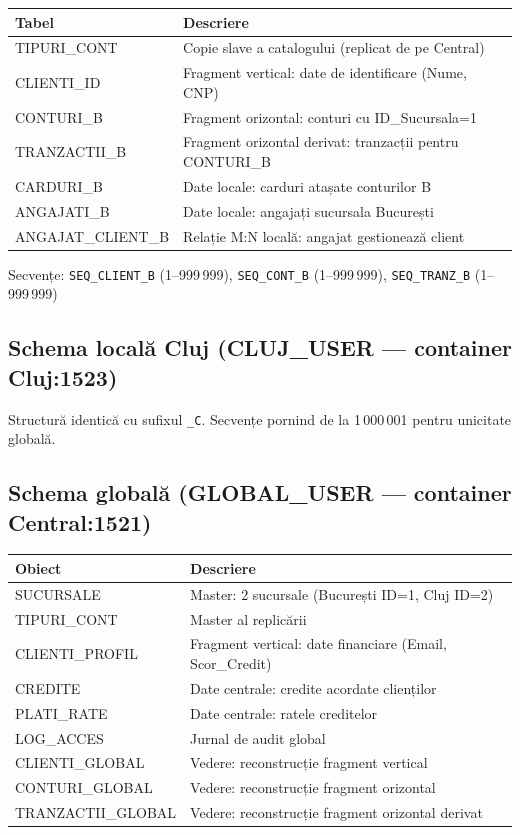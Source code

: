 \documentclass[12pt,a4paper]{article}
\begin{document}
\begin{center}
\begin{tabular}{ll}
\toprule
\textbf{Tabel} & \textbf{Descriere} \\
\midrule
TIPURI\_CONT & Copie slave a catalogului (replicat de pe Central) \\
CLIENTI\_ID & Fragment vertical: date de identificare (Nume, CNP) \\
CONTURI\_B & Fragment orizontal: conturi cu ID\_Sucursala=1 \\
TRANZACTII\_B & Fragment orizontal derivat: tranzacții pentru CONTURI\_B \\
CARDURI\_B & Date locale: carduri atașate conturilor B \\
ANGAJATI\_B & Date locale: angajați sucursala București \\
ANGAJAT\_CLIENT\_B & Relație M:N locală: angajat gestionează client \\
\bottomrule
\end{tabular}
\end{center}

Secvențe: \texttt{SEQ\_CLIENT\_B} (1–999\,999), \texttt{SEQ\_CONT\_B} (1–999\,999), \texttt{SEQ\_TRANZ\_B} (1–999\,999)

\subsection{Schema locală Cluj (CLUJ\_USER — container Cluj:1523)}

Structură identică cu sufixul \texttt{\_C}. Secvențe pornind de la 1\,000\,001 pentru unicitate globală.

\subsection{Schema globală (GLOBAL\_USER — container Central:1521)}

\begin{center}
\begin{tabular}{ll}
\toprule
\textbf{Obiect} & \textbf{Descriere} \\
\midrule
SUCURSALE & Master: 2 sucursale (București ID=1, Cluj ID=2) \\
TIPURI\_CONT & Master al replicării \\
CLIENTI\_PROFIL & Fragment vertical: date financiare (Email, Scor\_Credit) \\
CREDITE & Date centrale: credite acordate clienților \\
PLATI\_RATE & Date centrale: ratele creditelor \\
LOG\_ACCES & Jurnal de audit global \\
CLIENTI\_GLOBAL & Vedere: reconstrucție fragment vertical \\
CONTURI\_GLOBAL & Vedere: reconstrucție fragment orizontal \\
TRANZACTII\_GLOBAL & Vedere: reconstrucție fragment orizontal derivat \\
\bottomrule
\end{tabular}
\end{center}
\end{document}
